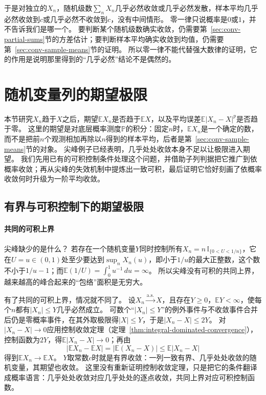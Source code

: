 于是对独立的$X_n$，随机级数$\sum_nX_n$几乎必然收敛或几乎必然发散，样本平均几乎必然收敛到$c$或几乎必然不收敛到$c$，没有中间情形。
零一律只说概率是$0$或$1$，并不告诉我们是哪一个。
要判断某个随机级数确实收敛，仍需要第~\ref{sec:conv-partial-sums}节的方差估计；要判断样本平均确实收敛到均值，仍需要第~\ref{sec:conv-sample-means}节的证明。
所以零一律不能代替强大数律的证明，它的作用是说明那里得到的“几乎必然”结论不是偶然的。

\section{随机变量列的期望极限}
\label{sec:conv-expectation-limits}

本节研究$X_n$趋于$X$之后，期望$\mathbb EX_n$是否趋于$\mathbb EX$，以及平均误差$\mathbb E|X_n-X|^p$是否趋于零。
这里的期望是对底层概率测度$\mathbb P$的积分：固定$n$时，$\mathbb EX_n$是一个确定的数，而不是把前$n$个观测相加再除以$n$得到的样本平均，后者是第~\ref{sec:conv-sample-means}节的对象。
尖峰例子已经表明，几乎处处收敛本身不足以让极限进入期望。
我们先用已有的可积控制条件处理这个问题，并借助子列判据把它推广到依概率收敛；再从尖峰的失效机制中提炼出一致可积，最后证明它恰好刻画了依概率收敛何时升级为一阶平均收敛。

\subsection{有界与可积控制下的期望极限}

\paragraph{共同的可积上界}
尖峰缺少的是什么？
若存在一个随机变量$Y$同时控制所有$X_n=n\,\mathbb I_{\{0<U<1/n\}}$，它在$U=u\in(0,1)$处至少要达到$\sup_nX_n(u)$，即小于$1/u$的最大正整数，这个数不小于$1/u-1$；而$\mathbb E(1/U)=\int_0^1u^{-1}\,du=\infty$。
所以尖峰没有可积的共同上界，越来越高的峰合起来的“包络”面积是无穷大。

有了共同的可积上界，情况就不同了。
设$X_n\xrightarrow{\mathrm{a.s.}}X$，且存在$Y\geq0$，$\mathbb EY<\infty$，使每个$n$都有$|X_n|\leq Y$几乎必然成立。
可数个“$|X_n|\leq Y$”的例外事件与不收敛事件合并后仍是零概率事件，在其外取极限得$|X|\leq Y$，于是$|X_n-X|\leq2Y$。
对$|X_n-X|\to0$应用控制收敛定理（定理~\ref{thm:integral-dominated-convergence}），控制函数为$2Y$，得$\mathbb E|X_n-X|\to0$；再由
\[
  |\mathbb EX_n-\mathbb EX|=|\mathbb E(X_n-X)|\leq\mathbb E|X_n-X|
\]
得到$\mathbb EX_n\to\mathbb EX$。
$Y$取常数$c$时就是有界收敛：一列一致有界、几乎处处收敛的随机变量，其期望也收敛。
这里没有重新证明控制收敛定理，只是把它的条件翻译成概率语言：几乎处处收敛对应几乎处处的逐点收敛，共同上界对应可积控制函数。

